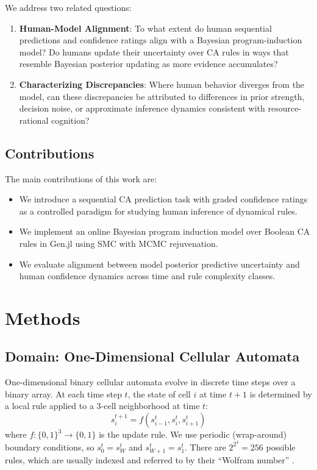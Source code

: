 \documentclass[10pt,letterpaper]{article}
\begin{document}
We address two related questions:
\begin{enumerate}
    \item \textbf{Human-Model Alignment}: To what extent do human sequential predictions and confidence ratings align with a Bayesian program-induction model? Do humans update their uncertainty over CA rules in ways that resemble Bayesian posterior updating as more evidence accumulates?
    
    \item \textbf{Characterizing Discrepancies}: Where human behavior diverges from the model, can these discrepancies be attributed to differences in prior strength, decision noise, or approximate inference dynamics consistent with resource-rational cognition?
\end{enumerate}

\subsection{Contributions}
The main contributions of this work are:
\begin{itemize}
    \item We introduce a sequential CA prediction task with graded confidence ratings as a controlled paradigm for studying human inference of dynamical rules.
    \item We implement an online Bayesian program induction model over Boolean CA rules in Gen.jl using SMC with MCMC rejuvenation.
    \item We evaluate alignment between model posterior predictive uncertainty and human confidence dynamics across time and rule complexity classes.
\end{itemize}


\section{Methods}

\subsection{Domain: One-Dimensional Cellular Automata}

One-dimensional binary cellular automata evolve in discrete time steps over a binary array. At each time step $t$, the state of cell $i$ at time $t+1$ is determined by a local rule applied to a 3-cell neighborhood at time $t$:
\begin{equation}
    s_i^{t+1} = f(s_{i-1}^t, s_i^t, s_{i+1}^t)
\end{equation}
where $f: \{0,1\}^3 \rightarrow \{0,1\}$ is the update rule. We use periodic (wrap-around) boundary conditions, so $s_0^t = s_W^t$ and $s_{W+1}^t = s_1^t$. There are $2^{2^3} = 256$ possible rules, which are usually indexed and referred to by their ``Wolfram number'' \cite{wolfram1983statistical}.
\end{document}
